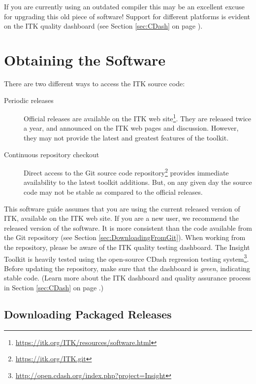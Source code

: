 If you are currently using an outdated compiler this may be an excellent excuse
for upgrading this old piece of software! Support for different platforms is
evident on the ITK quality dashboard (see Section \ref{sec:CDash} on page
\pageref{sec:CDash}).

\section{Obtaining the Software}
\label{sec:ObtainingTheSoftware}
\label{sec:DownloadingITK}

There are two different ways to access the ITK source code:
\begin{description}
  \item[Periodic releases]{Official releases are available on the ITK web
    site\footnote{\url{https://itk.org/ITK/resources/software.html}}.
    They are released twice a year,
    and announced on the ITK web pages and discussion.
    However, they may not provide the latest and greatest features of the
    toolkit.}
  \item[Continuous repository checkout]{Direct access to the Git source code
    repository\footnote{\url{https://itk.org/ITK.git}} provides immediate
    availability to the latest toolkit additions. But, on any given day the
    source code may not be stable as compared to the official releases.}
\end{description}

This software guide assumes that you are using the current released version of
ITK, available on the ITK web site. If you are a new user, we recommend the
released version of the software. It is more consistent
than the code available from the Git repository (see Section
\ref{sec:DownloadingFromGit}).  When working from the
repository, please be aware of the ITK quality testing dashboard. The Insight
Toolkit is heavily tested using the open-source CDash regression testing
system\footnote{\url{http://open.cdash.org/index.php?project=Insight}}. Before
updating the repository, make sure that the dashboard is \emph{green},
indicating stable code. (Learn more about the ITK dashboard and quality
assurance process in Section \ref{sec:CDash} on page \pageref{sec:CDash}.)

\subsection{Downloading Packaged Releases}
\label{sec:DownloadingReleases}

